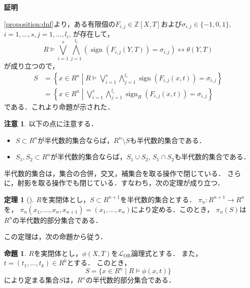 \documentclass[uplatex, dvipdfmx]{jsarticle}
\makeatletter
\numberwithin{equation}{section}
\renewenvironment{proof}[1][\proofname]{\par
  \pushQED{\qed}%
  \normalfont \topsep6\p@\@plus6\p@\relax
  \trivlist
  \item\relax
  {\bfseries
  #1\@addpunct{.}}\hspace\labelsep\ignorespaces
}{
  \popQED\endtrivlist\@endpefalse
}
\newcommand{\Z}{\mathbb{Z}}
\newcommand{\map}[3]{{#1}\colon{#2}\rightarrow{#3}}
\DeclareMathOperator{\sign}{sign}
\theoremstyle{definition}
\newtheorem{proposition}[definition]{命題}
\newtheorem{theorem}[definition]{定理}
\newtheorem{remark}[definition]{注意}
\renewcommand{\proofname}{\textbf{証明}}
\makeatother
\begin{document}
\begin{proof}
     \cref{proposition:dnf}より，ある有限個の$F_{i,j} \in \Z\left[X, T\right]$および$\sigma_{i,j} \in \{-1, 0 ,1\}$, $i=1, \dots, s, j = 1, \dots, l_i$, が存在して，
     \begin{equation}
          R \models
          \bigvee_{i=1}^s \bigwedge_{j=1}^{l_i}(\sign(F_{i,j}(Y, T))=\sigma_{i,j})
          \leftrightarrow \theta(Y,T)
     \end{equation}
     が成り立つので，
     \begin{align}
          S &= \left\{ x \in R^n \middle| R \models \bigvee_{i=1}^s \bigwedge_{j=1}^{l_i} \sign(F_{i,j}(x, t)) = \sigma_{i,j} \right\}\\
            &= \left\{ x \in R^n \middle| \bigvee_{i=1}^s \bigwedge_{j=1}^{l_i} \sign_R(F_{i,j}(x, t)) = \sigma_{i,j} \right\}
     \end{align}
     である．これより命題が示された．
\end{proof}


\begin{remark}
     以下の点に注意する．
     \begin{itemize}
          \item 
               $S \subset R^n$が半代数的集合ならば，$R^n \setminus S$も半代数的集合である．
          \item 
               $S_1, S_2 \subset R^n$が半代数的集合ならば，$S_1 \cup S_2$, $S_1 \cap S_2$も半代数的集合である．
     \end{itemize}
\end{remark}

半代数的集合は，集合の合併，交叉，補集合を取る操作で閉じている．
さらに，射影を取る操作でも閉じている．すなわち，次の定理が成り立つ．

\begin{theorem}[{\cite[Theorem 2.2.1]{MR1659509}}]\label{theorem:Tarski-Seidenberg}
     $R$を実閉体とし，$S \subset R^{n+1}$を半代数的集合とする．
     $\map{\pi_{n}}{R^{n+1}}{R^n}$を，
     $\pi_{n}(x_1, \dots, x_n, x_{n+1}) = (x_1, \dots, x_n)$により定める．このとき，
     $\pi_{n}(S)$は$R^n$の半代数的部分集合である．
\end{theorem}

この定理は，次の命題から従う．

\begin{proposition} \label{proposition:Seidenberg-Tarski-generalization}
     $R$を実閉体とし，$\phi(X, T)$を$\mathcal{L}_\mathrm{OR}$論理式とする．
     また，$t = (t_1, \dots, t_k) \in R^k$とする．
     このとき，
     \begin{equation}
          S = \{x \in R^n \mid R \models \phi(x,t) \}
     \end{equation}
     により定まる集合$S$は，$R^n$の半代数的部分集合である．
\end{proposition}
\end{document}
